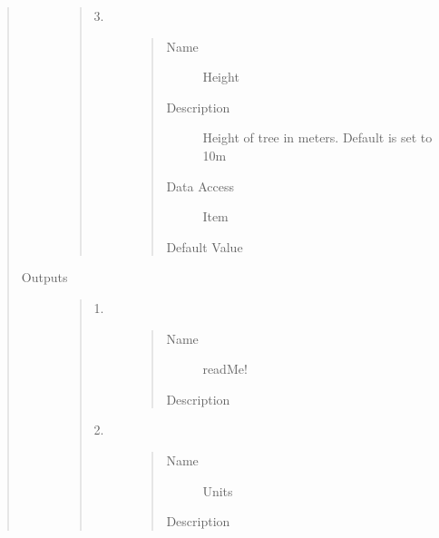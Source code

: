 \documentclass[letterpaper,10pt,english]{sphinxmanual}
\begin{document}
\begin{quote}
\begin{description}
\begin{quote}
\begin{description}
\item[{3.}] \leavevmode\begin{quote}\begin{description}
\item[{Name}] \leavevmode
Height

\item[{Description}] \leavevmode
Height of tree in meters. Default is set to 10m

\item[{Data Access}] \leavevmode
Item

\item[{Default Value}] \leavevmode
{}

\end{description}\end{quote}

\end{description}\end{quote}

\item[{Outputs}] \leavevmode\begin{quote}\begin{description}
\item[{1.}] \leavevmode\begin{quote}\begin{description}
\item[{Name}] \leavevmode
readMe!

\item[{Description}] \leavevmode
{}

\end{description}\end{quote}

\item[{2.}] \leavevmode\begin{quote}\begin{description}
\item[{Name}] \leavevmode
Units

\item[{Description}] \leavevmode
{}


\end{description}
\end{quote}
\end{description}
\end{quote}
\end{description}
\end{quote}
\end{document}
